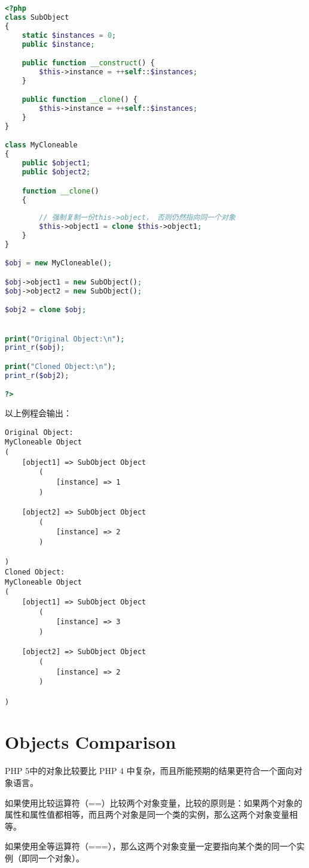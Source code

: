 \begin{lstlisting}[language=PHP]
<?php
class SubObject
{
    static $instances = 0;
    public $instance;

    public function __construct() {
        $this->instance = ++self::$instances;
    }

    public function __clone() {
        $this->instance = ++self::$instances;
    }
}

class MyCloneable
{
    public $object1;
    public $object2;

    function __clone()
    {
      
        // 强制复制一份this->object， 否则仍然指向同一个对象
        $this->object1 = clone $this->object1;
    }
}

$obj = new MyCloneable();

$obj->object1 = new SubObject();
$obj->object2 = new SubObject();

$obj2 = clone $obj;


print("Original Object:\n");
print_r($obj);

print("Cloned Object:\n");
print_r($obj2);

?>
\end{lstlisting}

以上例程会输出：

\begin{verbatim}
Original Object:
MyCloneable Object
(
    [object1] => SubObject Object
        (
            [instance] => 1
        )

    [object2] => SubObject Object
        (
            [instance] => 2
        )

)
Cloned Object:
MyCloneable Object
(
    [object1] => SubObject Object
        (
            [instance] => 3
        )

    [object2] => SubObject Object
        (
            [instance] => 2
        )

)
\end{verbatim}


\chapter{Objects Comparison}

PHP 5中的对象比较要比 PHP 4 中复杂，而且所能预期的结果更符合一个面向对象语言。

\begin{compactitem}
\item 如果使用比较运算符（=\/=）比较两个对象变量，比较的原则是：如果两个对象的属性和属性值都相等，而且两个对象是同一个类的实例，那么这两个对象变量相等。
\item 如果使用全等运算符（===），那么这两个对象变量一定要指向某个类的同一个实例（即同一个对象）。
\end{compactitem}



